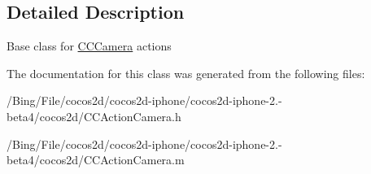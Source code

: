 \subsection{Detailed Description}
Base class for \hyperlink{interface_c_c_camera}{C\-C\-Camera} actions 

The documentation for this class was generated from the following files\-:\begin{DoxyCompactItemize}
\item 
/\-Bing/\-File/cocos2d/cocos2d-\/iphone/cocos2d-\/iphone-\/2.-\/beta4/cocos2d/C\-C\-Action\-Camera.\-h\item 
/\-Bing/\-File/cocos2d/cocos2d-\/iphone/cocos2d-\/iphone-\/2.-\/beta4/cocos2d/C\-C\-Action\-Camera.\-m\end{DoxyCompactItemize}
